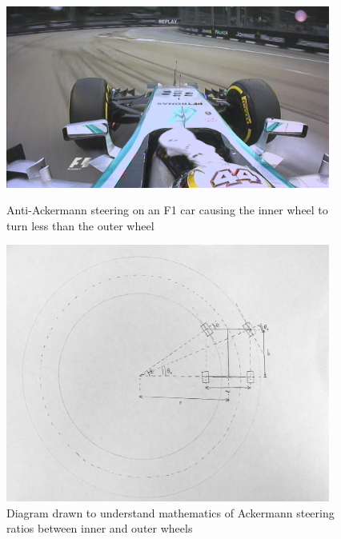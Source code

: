 \begin{figure}[ht]
\centering
\begin{minipage}[b]{.48\textwidth}
  \centering
  \includegraphics[width=0.95\textwidth]{Meetings/October/10-06-22/10-06-22_CAD_Figure1.jpg}
  \caption{Anti-Ackermann steering on an F1 car causing the inner wheel to turn less than the outer wheel}
  \label{fig:pic1}
\end{minipage}%
\hfill%
\begin{minipage}[b]{.48\textwidth}
  \centering
  \includegraphics[width=0.95\textwidth]{Meetings/October/10-06-22/10-06-22_CAD_Figure2.png}
  \caption{Diagram drawn to understand mathematics of Ackermann steering ratios between inner and outer wheels}
  \label{fig:pic2}
\end{minipage}
\end{figure}

